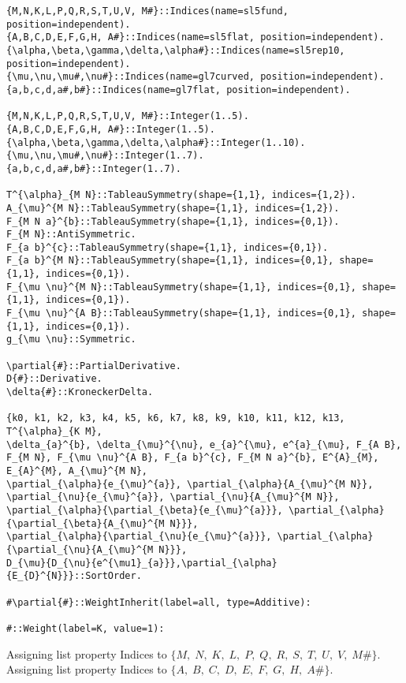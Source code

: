 \documentclass[11pt]{article}
\begin{document}
{\color[named]{Blue}\begin{verbatim}
{M,N,K,L,P,Q,R,S,T,U,V, M#}::Indices(name=sl5fund, position=independent).
{A,B,C,D,E,F,G,H, A#}::Indices(name=sl5flat, position=independent).
{\alpha,\beta,\gamma,\delta,\alpha#}::Indices(name=sl5rep10, position=independent).
{\mu,\nu,\mu#,\nu#}::Indices(name=gl7curved, position=independent).
{a,b,c,d,a#,b#}::Indices(name=gl7flat, position=independent).

{M,N,K,L,P,Q,R,S,T,U,V, M#}::Integer(1..5).
{A,B,C,D,E,F,G,H, A#}::Integer(1..5).
{\alpha,\beta,\gamma,\delta,\alpha#}::Integer(1..10).
{\mu,\nu,\mu#,\nu#}::Integer(1..7).
{a,b,c,d,a#,b#}::Integer(1..7).

T^{\alpha}_{M N}::TableauSymmetry(shape={1,1}, indices={1,2}).
A_{\mu}^{M N}::TableauSymmetry(shape={1,1}, indices={1,2}).
F_{M N a}^{b}::TableauSymmetry(shape={1,1}, indices={0,1}).
F_{M N}::AntiSymmetric.
F_{a b}^{c}::TableauSymmetry(shape={1,1}, indices={0,1}).
F_{a b}^{M N}::TableauSymmetry(shape={1,1}, indices={0,1}, shape={1,1}, indices={0,1}).
F_{\mu \nu}^{M N}::TableauSymmetry(shape={1,1}, indices={0,1}, shape={1,1}, indices={0,1}).
F_{\mu \nu}^{A B}::TableauSymmetry(shape={1,1}, indices={0,1}, shape={1,1}, indices={0,1}).
g_{\mu \nu}::Symmetric.

\partial{#}::PartialDerivative.
D{#}::Derivative.
\delta{#}::KroneckerDelta.

{k0, k1, k2, k3, k4, k5, k6, k7, k8, k9, k10, k11, k12, k13, T^{\alpha}_{K M},
\delta_{a}^{b}, \delta_{\mu}^{\nu}, e_{a}^{\mu}, e^{a}_{\mu}, F_{A B}, F_{M N}, F_{\mu \nu}^{A B}, F_{a b}^{c}, F_{M N a}^{b}, E^{A}_{M}, E_{A}^{M}, A_{\mu}^{M N},
\partial_{\alpha}{e_{\mu}^{a}}, \partial_{\alpha}{A_{\mu}^{M N}}, \partial_{\nu}{e_{\mu}^{a}}, \partial_{\nu}{A_{\mu}^{M N}}, 
\partial_{\alpha}{\partial_{\beta}{e_{\mu}^{a}}}, \partial_{\alpha}{\partial_{\beta}{A_{\mu}^{M N}}},
\partial_{\alpha}{\partial_{\nu}{e_{\mu}^{a}}}, \partial_{\alpha}{\partial_{\nu}{A_{\mu}^{M N}}}, 
D_{\mu}{D_{\nu}{e^{\mu1}_{a}}},\partial_{\alpha}{E_{D}^{N}}}::SortOrder.

#\partial{#}::WeightInherit(label=all, type=Additive):

#::Weight(label=K, value=1):
\end{verbatim}}
Assigning list property Indices to $\{M,\; N,\; K,\; L,\; P,\; Q,\; R,\; S,\; T,\; U,\; V,\; M\#\}$.
\\
Assigning list property Indices to $\{A,\; B,\; C,\; D,\; E,\; F,\; G,\; H,\; A\#\}$.
\\
\end{document}
